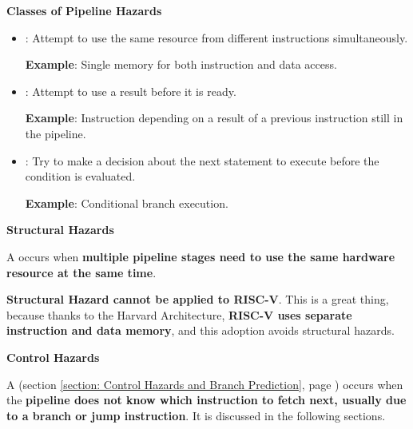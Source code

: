 \highspace
\begin{flushleft}
    \textcolor{Green3}{ \textbf{Classes of Pipeline Hazards}}
\end{flushleft}
\begin{itemize}
    \item {}: Attempt to use the same resource from different instructions simultaneously.
    
    \textcolor{Green3}{ \textbf{Example}}: Single memory for both instruction and data access.


    \item {}: Attempt to use a result before it is ready.

    \textcolor{Green3}{ \textbf{Example}}: Instruction depending on a result of a previous instruction still in the pipeline.
    
    
    \item {}: Try to make a decision about the next statement to execute before the condition is evaluated.
    
    \textcolor{Green3}{ \textbf{Example}}: Conditional branch execution.
\end{itemize}

\newpage

\begin{flushleft}
    \textcolor{Green3}{ \textbf{Structural Hazards}}
\end{flushleft}
A  occurs when \textbf{multiple pipeline stages need to use the same hardware resource at the same time}.

\highspace
\textcolor{Green3}{ \textbf{Structural Hazard cannot be applied to RISC-V}}. This is a great thing, because thanks to the Harvard Architecture, \textbf{RISC-V uses separate instruction and data memory}, and this adoption avoids structural hazards.


\highspace
\begin{flushleft}
    \textcolor{Red2}{ \textbf{Control Hazards}}
\end{flushleft}
A  (section \ref{section: Control Hazards and Branch Prediction}, page \pageref{section: Control Hazards and Branch Prediction}) occurs when the \textbf{pipeline does not know which instruction to fetch next, usually due to a branch or jump instruction}. It is discussed in the following sections.



